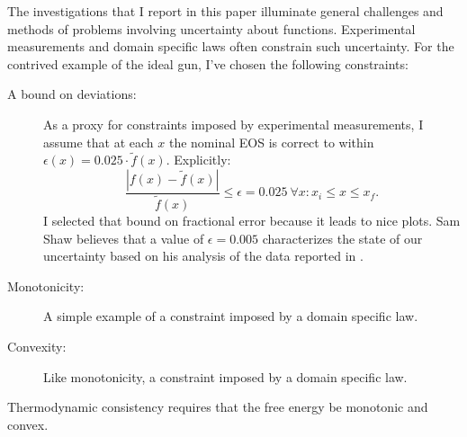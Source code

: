\documentclass[]{article}
\newcommand{\nomf}{\tilde f} \newcommand{\COST}{\cal C}
\newcommand\norm[1]{\left|#1\right|}
\newcommand\fracerror{0.025}
\begin{document}
The investigations that I report in this paper illuminate general
challenges and methods of problems involving uncertainty about
functions.  Experimental measurements and domain specific laws often
constrain such uncertainty.  For the contrived example of the ideal
gun, I've chosen the following constraints:
\begin{description}
\item[A bound on deviations:] As a proxy for constraints imposed by
  experimental measurements, I assume that at each $x$ the nominal EOS
  is correct to within $\epsilon(x) = \fracerror \cdot \nomf(x)$.
  Explicitly:
\begin{equation}
  \label{eq:bound}
  \frac{\norm{f(x)-\nomf(x)}}{\nomf(x)} \leq \epsilon = 0.025~\forall x : x_i
  \leq x \leq x_f.
\end{equation}
I selected that bound on fractional error because it leads to nice
plots.  Sam Shaw believes that a value of $\epsilon=0.005$
characterizes the state of our uncertainty based on his analysis of
the data reported in \cite{Hixson2000}.
\item[Monotonicity:] A simple example of a constraint imposed by a
  domain specific law.
\item[Convexity:] Like monotonicity, a constraint imposed by a domain
  specific law.
\end{description}
Thermodynamic consistency requires that the free energy be monotonic
and convex.
\end{document}
